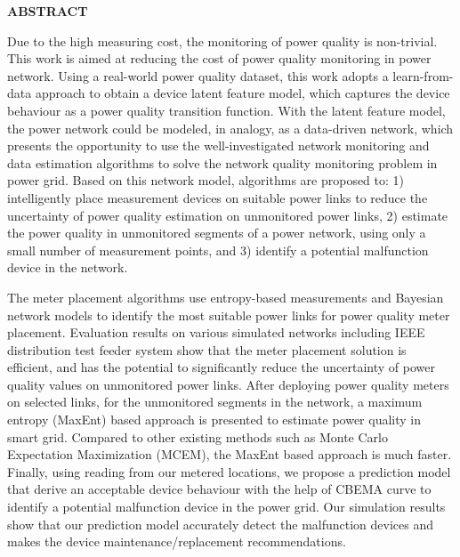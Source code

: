 \newpage
{}


\begin{center}
\textbf{ABSTRACT}
\end{center}

Due to the high measuring cost, the monitoring of power quality is non-trivial. This work is aimed at reducing the cost of power quality monitoring in power network. Using a real-world power quality dataset, this work adopts a learn-from-data approach to obtain a device latent feature model, which captures the device behaviour as a power quality transition function. With the latent feature model, the power network could be modeled, in analogy, as a data-driven network, which presents the opportunity to use the well-investigated network monitoring and data estimation algorithms to solve the network quality monitoring problem in power grid. Based on this network model, algorithms are proposed to: 1) intelligently place measurement devices on suitable power links to reduce the uncertainty of power quality estimation on unmonitored power links, 2) estimate the power quality in unmonitored segments of a power network, using only a small number of measurement points, and 3) identify a potential malfunction device in the network.

The meter placement algorithms use entropy-based measurements and Bayesian network models to identify the most suitable power links for power quality meter placement. Evaluation results on various simulated networks including IEEE distribution test feeder system show that the meter placement solution is efficient, and has the potential to significantly reduce the uncertainty of power quality values on unmonitored power links. After deploying power quality meters on selected links, for the unmonitored segments in the network, a maximum entropy (MaxEnt) based approach is presented to estimate power quality in smart grid. Compared to other existing methods such as Monte Carlo Expectation Maximization (MCEM), the MaxEnt based approach is much faster. Finally, using reading from our metered locations, we propose a prediction model that derive an acceptable device behaviour with the help of CBEMA curve to identify a potential malfunction device in the power grid. Our simulation results show that our prediction model accurately detect the malfunction devices and makes the device maintenance/replacement recommendations.